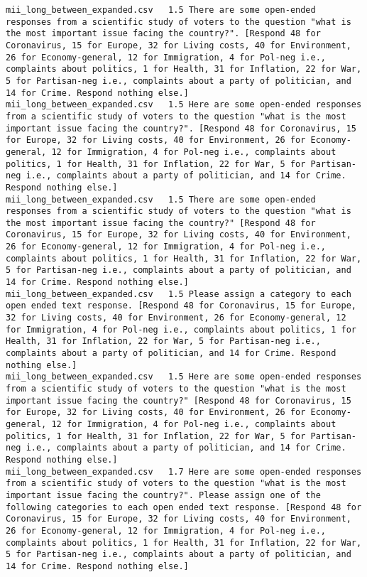 \begin{lstlisting}[label=lst:promptvariants]
mii_long_between_expanded.csv	1.5	There are some open-ended responses from a scientific study of voters to the question "what is the most important issue facing the country?". [Respond 48 for Coronavirus, 15 for Europe, 32 for Living costs, 40 for Environment, 26 for Economy-general, 12 for Immigration, 4 for Pol-neg i.e., complaints about politics, 1 for Health, 31 for Inflation, 22 for War, 5 for Partisan-neg i.e., complaints about a party of politician, and 14 for Crime. Respond nothing else.]
mii_long_between_expanded.csv	1.5	Here are some open-ended responses from a scientific study of voters to the question "what is the most important issue facing the country?". [Respond 48 for Coronavirus, 15 for Europe, 32 for Living costs, 40 for Environment, 26 for Economy-general, 12 for Immigration, 4 for Pol-neg i.e., complaints about politics, 1 for Health, 31 for Inflation, 22 for War, 5 for Partisan-neg i.e., complaints about a party of politician, and 14 for Crime. Respond nothing else.]
mii_long_between_expanded.csv	1.5	There are some open-ended responses from a scientific study of voters to the question "what is the most important issue facing the country?" [Respond 48 for Coronavirus, 15 for Europe, 32 for Living costs, 40 for Environment, 26 for Economy-general, 12 for Immigration, 4 for Pol-neg i.e., complaints about politics, 1 for Health, 31 for Inflation, 22 for War, 5 for Partisan-neg i.e., complaints about a party of politician, and 14 for Crime. Respond nothing else.]
mii_long_between_expanded.csv	1.5	Please assign a category to each open ended text response. [Respond 48 for Coronavirus, 15 for Europe, 32 for Living costs, 40 for Environment, 26 for Economy-general, 12 for Immigration, 4 for Pol-neg i.e., complaints about politics, 1 for Health, 31 for Inflation, 22 for War, 5 for Partisan-neg i.e., complaints about a party of politician, and 14 for Crime. Respond nothing else.]
mii_long_between_expanded.csv	1.5	Here are some open-ended responses from a scientific study of voters to the question "what is the most important issue facing the country?" [Respond 48 for Coronavirus, 15 for Europe, 32 for Living costs, 40 for Environment, 26 for Economy-general, 12 for Immigration, 4 for Pol-neg i.e., complaints about politics, 1 for Health, 31 for Inflation, 22 for War, 5 for Partisan-neg i.e., complaints about a party of politician, and 14 for Crime. Respond nothing else.]
mii_long_between_expanded.csv	1.7	Here are some open-ended responses from a scientific study of voters to the question "what is the most important issue facing the country?". Please assign one of the following categories to each open ended text response. [Respond 48 for Coronavirus, 15 for Europe, 32 for Living costs, 40 for Environment, 26 for Economy-general, 12 for Immigration, 4 for Pol-neg i.e., complaints about politics, 1 for Health, 31 for Inflation, 22 for War, 5 for Partisan-neg i.e., complaints about a party of politician, and 14 for Crime. Respond nothing else.]

\end{lstlisting}
